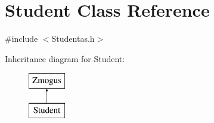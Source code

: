 \hypertarget{class_student}{}\section{Student Class Reference}
\label{class_student}


{\ttfamily \#include $<$Studentas.\+h$>$}

Inheritance diagram for Student\+:\begin{figure}[H]
\begin{center}
\leavevmode
\includegraphics[height=2.000000cm]{class_student}
\end{center}
\end{figure}
